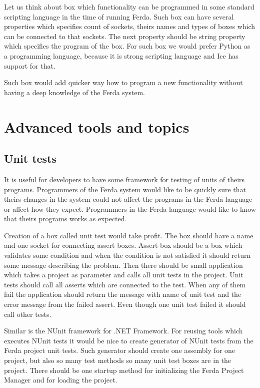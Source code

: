 \documentclass[a4paper,12pt]{book}
\begin{document}
Let us think about box which functionality can be programmed in some standard scripting language in the time of running Ferda. Such box can have several properties which specifies count of sockets, theirs names and types of boxes which can be connected to that sockets. The next property should be string property which specifies the program of the box. For such box we would prefer Python as a programming language, because it is strong scripting language and Ice has support for that.

Such box would add quicker way how to program a new functionality without having a deep knowledge of the Ferda system. 

\section{Advanced tools and topics}

\subsection{Unit tests}
It is useful for developers to have some framework for testing of units of theirs programs. Programmers of the Ferda system would like to be quickly sure that theirs changes in the system could not affect the programs in the Ferda language or affect how they expect. Programmers in the Ferda language would like to know that theirs programs works as expected.

Creation of a box called unit test would take profit. The box should have a name and one socket for connecting assert boxes. Assert box should be a box which validates some condition and when the condition is not satisfied it should return some message describing the problem. Then there should be small application which takes a project as parameter and calls all unit tests in the project. Unit tests should call all asserts which are connected to the test. When any of them fail the application should return the message with name of unit test and the error message from the failed assert. Even though one unit test failed it should call other tests.

Similar is the NUnit framework for .NET Framework. For reusing tools which executes NUnit tests it would be nice to create generator of NUnit tests from the Ferda project unit tests. Such generator should create one assembly for one project, but also so many test methods so many unit test boxes are in the project. There should be one startup method for initializing the Ferda Project Manager and for loading the project. 
\end{document}
